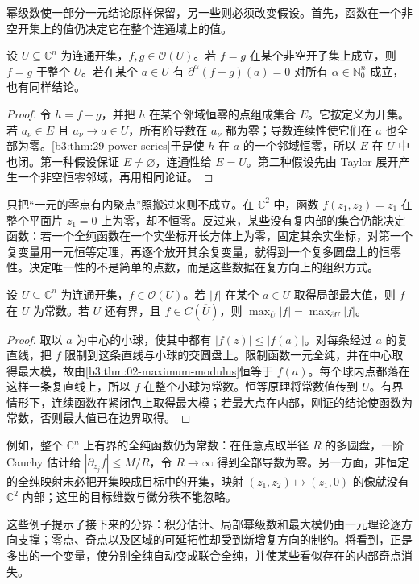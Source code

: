 幂级数使一部分一元结论原样保留，另一些则必须改变假设。首先，函数在一个非空开集上的值仍决定它在整个连通域上的值。

\begin{theorem}[恒等原理]\label{b3:thm:29-identity}
设 \(U\subseteq\mathbb C^n\) 为连通开集，\(f,g\in\mathcal O(U)\)。若 \(f=g\) 在某个非空开子集上成立，则 \(f=g\) 于整个 \(U\)。若在某个 \(a\in U\) 有 \(\partial^\alpha(f-g)(a)=0\) 对所有 \(\alpha\in\mathbb N_0^n\) 成立，也有同样结论。
\end{theorem}
\begin{proof}
令 \(h=f-g\)，并把 \(h\) 在某个邻域恒零的点组成集合 \(E\)。它按定义为开集。若 \(a_\nu\in E\) 且 \(a_\nu\to a\in U\)，所有阶导数在 \(a_\nu\) 都为零；导数连续性使它们在 \(a\) 也全部为零。\cref{b3:thm:29-power-series}于是使 \(h\) 在 \(a\) 的一个邻域恒零，所以 \(E\) 在 \(U\) 中也闭。第一种假设保证 \(E\ne\varnothing\)，连通性给 \(E=U\)。第二种假设先由 Taylor 展开产生一个非空恒零邻域，再用相同论证。
\end{proof}

只把“一元的零点有内聚点”照搬过来则不成立。在 \(\mathbb C^2\) 中，函数 \(f(z_1,z_2)=z_1\) 在整个平面片 \(z_1=0\) 上为零，却不恒零。反过来，某些没有复内部的集合仍能决定函数：若一个全纯函数在一个实坐标开长方体上为零，固定其余实坐标，对第一个复变量用一元恒等定理，再逐个放开其余复变量，就得到一个复多圆盘上的恒零性。决定唯一性的不是简单的点数，而是这些数据在复方向上的组织方式。

\begin{theorem}[最大模原理]\label{b3:thm:29-maximum-modulus}
设 \(U\subseteq\mathbb C^n\) 为连通开集，\(f\in\mathcal O(U)\)。若 \(|f|\) 在某个 \(a\in U\) 取得局部最大值，则 \(f\) 在 \(U\) 为常数。若 \(U\) 还有界，且 \(f\in C(\overline U)\)，则 \(\max_{\overline U}|f|=\max_{\partial U}|f|\)。
\end{theorem}
\begin{proof}
取以 \(a\) 为中心的小球，使其中都有 \(|f(z)|\le|f(a)|\)。对每条经过 \(a\) 的复直线，把 \(f\) 限制到这条直线与小球的交圆盘上。限制函数一元全纯，并在中心取得最大模，故由\cref{b3:thm:02-maximum-modulus}恒等于 \(f(a)\)。每个球内点都落在这样一条复直线上，所以 \(f\) 在整个小球为常数。恒等原理将常数值传到 \(U\)。有界情形下，连续函数在紧闭包上取得最大模；若最大点在内部，刚证的结论使函数为常数，否则最大值已在边界取得。
\end{proof}

例如，整个 \(\mathbb C^n\) 上有界的全纯函数仍为常数：在任意点取半径 \(R\) 的多圆盘，一阶 Cauchy 估计给 \(|\partial_{z_j}f|\le M/R\)，令 \(R\to\infty\) 得到全部导数为零。另一方面，非恒定的全纯映射未必把开集映成目标中的开集，映射 \((z_1,z_2)\mapsto(z_1,0)\) 的像就没有 \(\mathbb C^2\) 内部；这里的目标维数与微分秩不能忽略。

\ProseParagraphBreak
这些例子提示了接下来的分界：积分估计、局部幂级数和最大模仍由一元理论逐方向支撑；零点、奇点以及区域的可延拓性却受到新增复方向的制约。将看到，正是多出的一个变量，使分别全纯自动变成联合全纯，并使某些看似存在的内部奇点消失。
